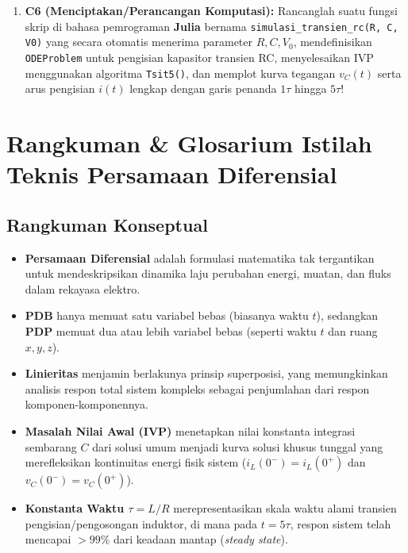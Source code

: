 \documentclass[11pt,a4paper]{article}
\theoremstyle{definition}
\begin{document}
\begin{enumerate}[leftmargin=*]
    \item \textbf{C6 (Menciptakan/Perancangan Komputasi):}
    Rancanglah suatu fungsi skrip di bahasa pemrograman \textbf{Julia} bernama \texttt{simulasi\_transien\_rc(R, C, V0)} yang secara otomatis menerima parameter $R, C, V_0$, mendefinisikan \texttt{ODEProblem} untuk pengisian kapasitor transien RC, menyelesaikan IVP menggunakan algoritma \texttt{Tsit5()}, dan memplot kurva tegangan $v_C(t)$ serta arus pengisian $i(t)$ lengkap dengan garis penanda $1\tau$ hingga $5\tau$!
\end{enumerate}


\section{Rangkuman \& Glosarium Istilah Teknis Persamaan Diferensial}

\subsection{Rangkuman Konseptual}
\begin{itemize}
    \item \textbf{Persamaan Diferensial} adalah formulasi matematika tak tergantikan untuk mendeskripsikan dinamika laju perubahan energi, muatan, dan fluks dalam rekayasa elektro.
    \item \textbf{PDB} hanya memuat satu variabel bebas (biasanya waktu $t$), sedangkan \textbf{PDP} memuat dua atau lebih variabel bebas (seperti waktu $t$ dan ruang $x, y, z$).
    \item \textbf{Linieritas} menjamin berlakunya prinsip superposisi, yang memungkinkan analisis respon total sistem kompleks sebagai penjumlahan dari respon komponen-komponennya.
    \item \textbf{Masalah Nilai Awal (IVP)} menetapkan nilai konstanta integrasi sembarang $C$ dari solusi umum menjadi kurva solusi khusus tunggal yang merefleksikan kontinuitas energi fisik sistem ($i_L(0^-) = i_L(0^+)$ dan $v_C(0^-) = v_C(0^+)$).
    \item \textbf{Konstanta Waktu $\tau = L/R$} merepresentasikan skala waktu alami transien pengisian/pengosongan induktor, di mana pada $t = 5\tau$, respon sistem telah mencapai $>99\%$ dari keadaan mantap (\textit{steady state}).
\end{itemize}
\end{document}
